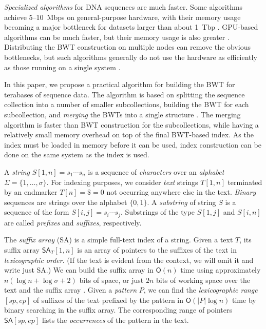 \documentclass[smallabstract,smallcaptions]{dccpaper}
\newcommand{\set}[1]{\ensuremath{\{ #1 \}}}
\newcommand{\abs}[1]{\ensuremath{\lvert #1 \rvert}}
\newcommand{\Oh}{\ensuremath{\mathsf{O}}}
\newcommand{\SA}{\textsf{SA}}
\newcommand{\BWT}{\textsf{BWT}}
\newcommand{\mSA}{\ensuremath{\mathsf{SA}}}
\begin{document}
\emph{Specialized algorithms} for DNA sequences are much faster. Some algorithms achieve 5\nobreakdash--10~Mbps on general-purpose hardware, with their memory usage becoming a major bottleneck for datasets larger than about 1~Tbp \cite{Bauer2013,Li2014a}. GPU-based algorithms can be much faster, but their memory usage is also greater \cite{Liu2014,Pantaleoni2014}. Distributing the \BWT{} construction on multiple nodes can remove the obvious bottlenecks, but such algorithms generally do not use the hardware as efficiently as those running on  a single system \cite{Wang2015}.

In this paper, we propose a practical algorithm for building the \BWT{} for terabases of sequence data. The algorithm is based on splitting the sequence collection into a number of smaller subcollections, building the \BWT{} for each subcollection, and \emph{merging} the \BWT{}s into a single structure \cite{Siren2009}. The merging algorithm is faster than \BWT{} construction for the subcollections, while having a relatively small memory overhead on top of the final \BWT-based index. As the index must be loaded in memory before it can be used, index construction can be done on the same system as the index is used.



A \emph{string} $S[1,n] = s_{1} \dotsm s_{n}$ is a sequence of \emph{characters} over an \emph{alphabet} $\Sigma = \set{1, \dotsc, \sigma}$. For indexing purposes, we consider \emph{text} strings $T[1,n]$ terminated by an endmarker $T[n] = \$ = 0$ not occurring anywhere else in the text. \emph{Binary} sequences are strings over the alphabet $\set{0, 1}$. A \emph{substring} of string $S$ is a sequence of the form $S[i,j] = s_{i} \dotsm s_{j}$. Substrings of the type $S[1,j]$ and $S[i,n]$ are called \emph{prefixes} and \emph{suffixes}, respectively.

The \emph{suffix array} (\SA) \cite{Manber1993} is a simple full-text index of a string. Given a text $T$, its suffix array $\mSA_{T}[1,n]$ is an array of pointers to the suffixes of the text in \emph{lexicographic order}. (If the text is evident from the context, we will omit it and write just \SA.) We can build the suffix array in $\Oh(n)$ time using approximately $n(\log n + \log \sigma + 2)$ bits of space, or just $2n$ bits of working space over the text and the suffix array \cite{Nong2011}. Given a \emph{pattern} $P$, we can find the \emph{lexicographic range} $[sp,ep]$ of suffixes of the text prefixed by the pattern in $\Oh(\abs{P} \log n)$ time by binary searching in the suffix array. The corresponding range of pointers $\mSA[sp,ep]$ lists the \emph{occurrences} of the pattern in the text.
\end{document}
